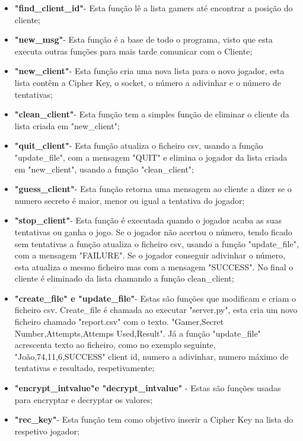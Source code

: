 \documentclass{report}
\begin{document}
\begin{itemize}
  \item \textbf{"find\_client\_id"}\space- Esta função lê a lista gamers até encontrar a posição do cliente;
  \item \textbf{"new\_msg"}\space- Esta função é a base de todo o programa, visto que esta executa outras funções para mais tarde comunicar com o Cliente;
  \item\textbf{"new\_client"}\space- Esta função cria uma nova lista para o novo jogador, esta lista contêm a Cipher Key, o socket, o número a adivinhar e o número de tentativas;
  \item\textbf{"clean\_client"}\space- Esta função tem a simples função de eliminar o cliente da lista criada em "new\_client";
  \item \textbf{"quit\_client"}\space- Esta função atualiza o ficheiro csv, usando a função "update\_file", com a mensagem "QUIT" e elimina o jogador da lista criada em "new\_client", usando a função "clean\_client";
  \item \textbf{"guess\_client"}\space- Esta função retorna uma mensagem ao cliente a dizer se o numero secreto é maior, menor ou igual a tentativa do jogador;
  \item \textbf{"stop\_client"}\space- Esta função é executada quando o jogador acaba as suas tentativas ou ganha o jogo. Se o jogador não acertou o número, tendo ficado sem tentativas a função atualiza o ficheiro csv, usando a função "update\_file", com a mensagem "FAILURE". Se o jogador conseguir adivinhar o número, esta atualiza o mesmo ficheiro mas com a mensagem "SUCCESS". No final o cliente é eliminado da lista chamando a função clean\_client;
  \item \textbf{"create\_file" \space e "update\_file"}\space- Estas são funções que  modificam e criam o ficheiro csv. Create\_file é chamada ao executar "server.py", esta cria um novo ficheiro chamado "report.csv" com o texto.
  "Gamer,Secret Number,Attempts,Attemps Used,Result". Já a função "update\_file" acrescenta texto ao ficheiro, como no exemplo seguinte, "João,74,11,6,SUCCESS" client id, numero a adivinhar, numero máximo de tentativas e resultado, respetivamente;
  \item \textbf{"encrypt\_intvalue"\space e "decrypt\_intvalue"} \space- Estas são funções usadas para encryptar e decryptar os valores;
  \item \textbf{"rec\_key"}\space- Esta função tem como objetivo inserir a Cipher Key na lista do respetivo jogador;
\end{itemize}
\end{document}
